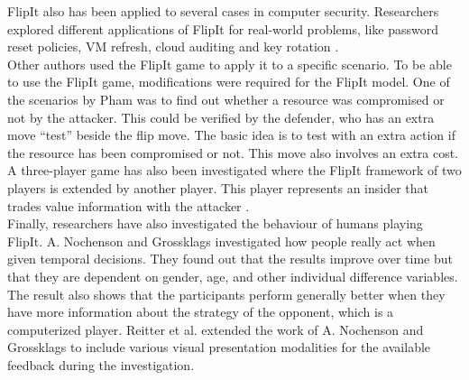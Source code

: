 FlipIt also has been applied to several cases in computer security. Researchers explored different applications of FlipIt for real-world problems, like password reset policies, VM refresh, cloud auditing and key rotation \cite{ApplyingFlipit}. \\
Other authors used the FlipIt game to apply it to a specific scenario. To be able to use the FlipIt game, modifications were required for the FlipIt model.
One of the scenarios by Pham \cite{compromised} was to find out whether a resource was compromised or not by the attacker. This could be verified by the defender, who has an extra move ``test'' beside the flip move. The basic idea is to test with an extra action if the resource has been compromised or not. This move also involves an extra cost.\\
A three-player game has also been investigated where the FlipIt framework of two players is extended by another player. This player represents an insider that trades value information with the attacker \cite{fengstealthy}.\\


Finally, researchers have also investigated the behaviour of humans playing FlipIt. A. Nochenson and Grossklags \cite{nochenson2013behavioral}  investigated how people really act when given temporal decisions. They found out that the results improve over time but that they are dependent on gender, age, and other individual difference variables. The result also shows that the participants perform generally better when they have more information about the strategy of the opponent, which is a computerized player. Reitter et al. \cite{reitter2013risk} extended the work of A. Nochenson and Grossklags to include various visual presentation modalities for the available feedback during the investigation.\\







